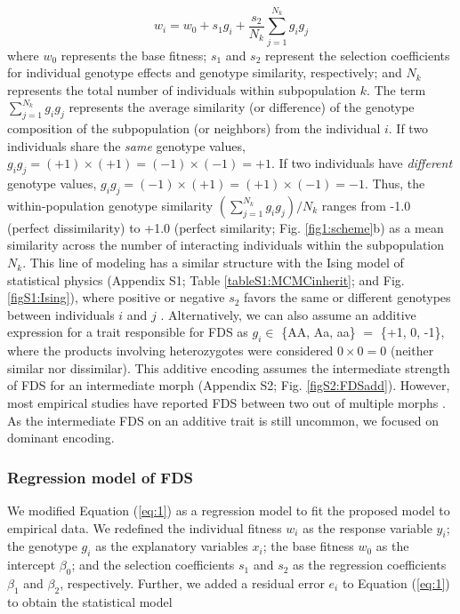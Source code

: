 \documentclass[12pt,]{article}
\begin{document}
\begin{equation}
w_i = w_0 + s_1 g_i + \frac{s_2}{N_k}\sum^{N_{k}}_{j=1}{g_ig_j}\label{eq:1}
\end{equation}
\noindent
where $w_0$ represents the base fitness; $s_1$ and $s_2$ represent the selection coefficients for individual genotype effects and genotype similarity, respectively; and $N_k$ represents the total number of individuals within subpopulation $k$. The term $\sum^{N_{k}}_{j=1}{g_ig_j}$ represents the average similarity (or difference) of the genotype composition of the subpopulation (or neighbors) from the individual $i$. If two individuals share the \textit{same} genotype values, $g_ig_j = (+1)\times(+1) = (-1)\times(-1) = +1$. If two individuals have \textit{different} genotype values, $g_ig_j = (-1)\times(+1) = (+1)\times(-1) = -1$. Thus, the within-population genotype similarity $(\sum^{N_{k}}_{j=1}{g_ig_j})/N_k$ ranges from -1.0 (perfect dissimilarity) to +1.0 (perfect similarity; Fig. \ref{fig1:scheme}b) as a mean similarity across the number of interacting individuals within the subpopulation $N_k$. This line of modeling has a similar structure with the Ising model of statistical physics (Appendix S1; Table \ref{tableS1:MCMCinherit}; and Fig. \ref{figS1:Ising}), where positive or negative $s_2$ favors the same or different genotypes between individuals $i$ and $j$ \citep{sato2019neighbor}. Alternatively, we can also assume an additive expression for a trait responsible for FDS as $g_i \in$ \{AA, Aa, aa\} $=$ \{+1, 0, -1\}, where the products involving heterozygotes were considered $0 \times 0 = 0$ (neither similar nor dissimilar). This additive encoding assumes the intermediate strength of FDS for an intermediate morph (Appendix S2; Fig. \ref{figS2:FDSadd}). However, most empirical studies have reported FDS between two out of multiple morphs \citep[e.g.,][]{gigord2001negative,takahashi2010negative,le2015evolutionary,sato2017herbivore,nosil2018natural}. As the intermediate FDS on an additive trait is still uncommon, we focused on dominant encoding.

\subsubsection{Regression model of FDS}
We modified Equation (\ref{eq:1}) as a regression model to fit the proposed model to empirical data. We redefined the individual fitness $w_i$ as the response variable $y_i$; the genotype $g_i$ as the explanatory variables $x_i$; the base fitness $w_0$ as the intercept $\beta_0$; and the selection coefficients $s_1$ and $s_2$ as the regression coefficients $\beta_1$ and $\beta_2$, respectively. Further, we added a residual error $e_i$ to Equation (\ref{eq:1}) to obtain the statistical model 
\end{document}
